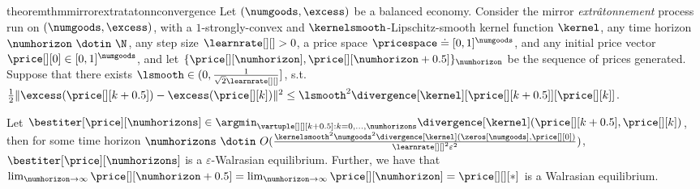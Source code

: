 \begin{restatable}{theorem}{thmmirrorextratatonnconvergence}\label{thm:mirror_extra_tatonn_convergence}
    Let $(\numgoods, \excess)$ be a balanced economy. 
    Consider the mirror \emph{extr\^atonnement} process run on $(\numgoods, \excess)$, with a $1$-strongly-convex and $\kernelsmooth$-Lipschitz-smooth kernel function $\kernel$, any time horizon $\numhorizon \ \dotin \  \N$, any step size $\learnrate[ ][ ] > 0$, a price space $\pricespace \doteq [0, 1]^\numgoods$, and any initial price vector $\price[][0] \in [0, 1]^\numgoods$, and let $\{\price[][\numhorizon], \price[][\numhorizon + 0.5] \}_{\numhorizon}$ be the sequence of prices generated. Suppose that there exists $\lsmooth \in (0, \frac{1}{\sqrt{2}\learnrate[ ][ ]}]$, s.t. $\frac{1}{2}\|\excess(\price[][k+0.5]) - \excess(\price[][k])\|^2 \leq \lsmooth^2 \divergence[\kernel][{\price[][k+0.5]}][{\price[][k]}]$. 

    Let $\bestiter[{\price}][\numhorizons] \in \argmin_{\vartuple[][][k+0.5] : k = 0, \hdots, \numhorizons} \divergence[\kernel](\price[][k+0.5], \price[][k])$, then for some time horizon $\numhorizons \ \dotin \ O(\frac{\kernelsmooth^2 \numgoods^2 \divergence[\kernel](\zeros[\numgoods], \price[][0])}{\learnrate[ ][ ]^2 \varepsilon^2})$, 
    $\bestiter[{\price}][\numhorizons]$ is a $\varepsilon$-Walrasian equilibrium.
% 
    Further, we have that $\lim_{\numhorizon \to \infty} \price[][\numhorizon+0.5] = \lim_{\numhorizon \to \infty} \price[][\numhorizon] = \price[][][*]$ is a Walrasian equilibrium.
\end{restatable}



